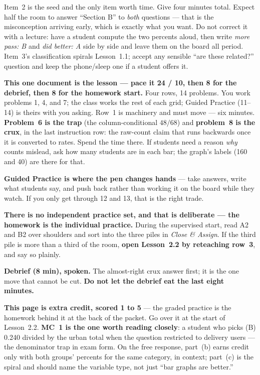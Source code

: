 \documentclass[10pt]{article}
\begin{document}
\begin{teachernote}[Warm-Up]
Item~2 is the seed and the only item worth time. Give four minutes total. Expect half the room
to answer ``Section B'' to \emph{both} questions --- that is the misconception arriving early,
which is exactly what you want. Do not correct it with a lecture: have a student compute the two
percents aloud, then write \emph{more pass: B} and \emph{did better: A} side by side and leave
them on the board all period. Item~3's classification spirals Lesson~1.1; accept any sensible
``are these related?'' question and keep the phone/sleep one if a student offers it.
\end{teachernote}

\begin{teachernote}
\textbf{This one document is the lesson --- pace it 24 / 10, then 8 for the debrief, then 8 for
the homework start.} Four rows, 14 problems. You work problems 1, 4, and 7; the class works the
rest of each grid; Guided Practice (11--14) is theirs with you asking. Row~1 is machinery and
must move --- six minutes. \textbf{Problem~6 is the trap} (the column-conditional $48/68$) and
\textbf{problem~8 is the crux}, in the last instruction row: the raw-count claim that runs
backwards once it is converted to rates. Spend the time there. If students need a reason
\emph{why} counts mislead, ask how many students are in each bar; the graph's labels (160 and 40)
are there for that.

\textbf{Guided Practice is where the pen changes hands} --- take answers, write what students
say, and push back rather than working it on the board while they watch. If you only get
through 12 and 13, that is the right trade.

\textbf{There is no independent practice set, and that is deliberate --- the homework is the
individual practice.} During the supervised start, read A2 and B2 over shoulders and sort into
the three piles in \emph{Close \& Assign}. If the third pile is more than a third of the room,
\textbf{open Lesson~2.2 by reteaching row~3}, and say so plainly.

\textbf{Debrief (8 min), spoken.} The almost-right crux answer first; it is the one move that
cannot be cut. \textbf{Do not let the debrief eat the last eight minutes.}
\end{teachernote}

\begin{teachernote}[AP Practice]
\textbf{This page is extra credit, scored 1 to 5} --- the graded practice is the homework behind
it at the back of the packet. Go over it at the start of Lesson~2.2. \textbf{MC~1 is the one
worth reading closely}: a student who picks (B) 0.240 divided by the urban total when the question
restricted to delivery users --- the denominator trap in exam form. On the free response, part~(b)
earns credit only with both groups' percents for the same category, in context; part~(c) is the
spiral and should name the variable type, not just ``bar graphs are better.''
\end{teachernote}
\end{document}
